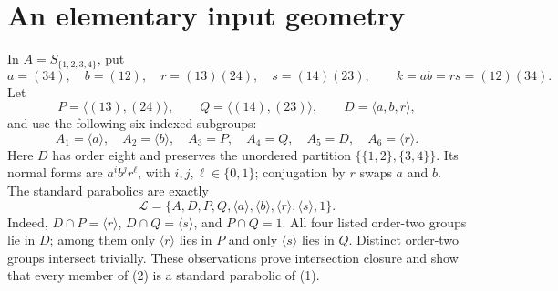 \documentclass[11pt,a4paper]{article}
\newcommand{\gen}[1]{\langle #1\rangle}
\begin{document}
\section{An elementary input geometry}
In $A=S_{\{1,2,3,4\}}$, put
\[
 a=(34),\quad b=(12),\quad r=(13)(24),\quad s=(14)(23),
 \qquad k=ab=rs=(12)(34).
\]
Let
\[
 P=\gen{(13),(24)},\qquad Q=\gen{(14),(23)},\qquad
 D=\gen{a,b,r},
\]
and use the following six indexed subgroups:
\[
 A_1=\gen a,\quad A_2=\gen b,\quad A_3=P,\quad
 A_4=Q,\quad A_5=D,\quad A_6=\gen r.                 \tag{1}
\]
Here $D$ has order eight and preserves the unordered partition
$\{\{1,2\},\{3,4\}\}$. Its normal forms are $a^i b^j r^\ell$, with
$i,j,\ell\in\{0,1\}$; conjugation by $r$ swaps $a$ and $b$.
The standard parabolics are exactly
\[
 \mathcal L=\{A,D,P,Q,\gen a,\gen b,\gen r,\gen s,1\}.       \tag{2}
\]
Indeed, $D\cap P=\gen r$, $D\cap Q=\gen s$, and $P\cap Q=1$.
All four listed order-two groups lie in $D$; among them only $\gen r$
lies in $P$ and only $\gen s$ lies in $Q$. Distinct order-two groups
intersect trivially. These observations prove intersection closure and
show that every member of (2) is a standard parabolic of (1).
\end{document}
